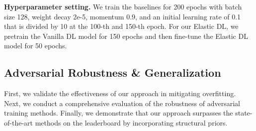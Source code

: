 \textbf{Hyperparameter setting.}
We train the baselines for 200 epochs with batch size 128, weight decay 2e-5, momentum 0.9, and an initial learning rate of 0.1 that is divided by 10 at the 100-th and 150-th epoch. For our Elastic DL, we pretrain the Vanilla DL model for 150 epochs and then fine-tune the Elastic DL model for 50 epochs.






\subsection{Adversarial Robustness \& Generalization}

First, we validate the effectiveness of our approach in mitigating overfitting. Next, we conduct a comprehensive evaluation of the robustness of adversarial training methods. Finally, we demonstrate that our approach surpasses the state-of-the-art methods on the leaderboard by incorporating structural priors.

